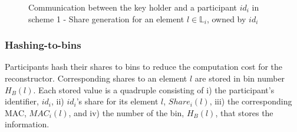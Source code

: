 \begin{figure}[h!]
   \caption{Communication between the key holder and a participant $id_i$ in scheme 1 - Share generation for an element $l \in \mathbb{L}_i$, owned by $id_i$}
   \label{fig:S1_ShareGen}
\end{figure}

\subsubsection{Hashing-to-bins}\label{Binning_S1}
Participants hash their shares to bins to reduce the computation cost for the reconstructor. Corresponding shares to an element $l$ are stored in bin number $H_B(l)$. Each stored value is a quadruple consisting of i) the participant's identifier, $id_i$, ii) $id_i$'s share for its element $l$, $Share_i(l)$, iii) the corresponding MAC, $MAC_i(l)$, and iv) the number of the bin, $H_B(l)$, that stores the information.

